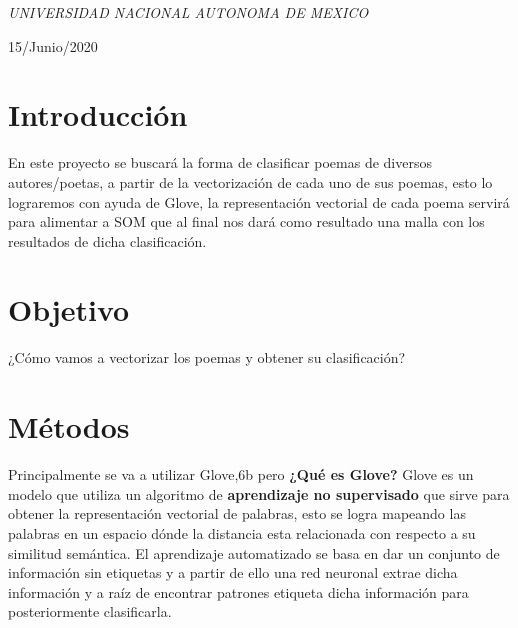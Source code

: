 \documentclass[a4paper, 11pt, oneside]{article}
\begin{document}
\begin{titlepage}
	\textit{UNIVERSIDAD NACIONAL AUTONOMA DE MEXICO} 
	
	\vfill
	
	
	
	
	\vspace{0.3\baselineskip} 
	
    15/Junio/2020
	
	 

\end{titlepage}
\newpage
\section*{Introducción}

En este proyecto se buscará la forma de clasificar poemas de diversos autores/poetas, a partir de la vectorización de cada uno de sus poemas, esto lo lograremos con ayuda de Glove, la representación vectorial de cada poema servirá para alimentar a SOM que al final nos dará como resultado una malla con los resultados de dicha clasificación.

\section*{Objetivo}
¿Cómo vamos a vectorizar los poemas y obtener su clasificación?
\section*{Métodos}
Principalmente se va a utilizar Glove,6b pero \textbf{¿Qué es Glove?} Glove es un modelo que utiliza un algoritmo de \textbf{aprendizaje no supervisado} que sirve para obtener la representación vectorial de palabras, esto se logra mapeando las palabras en un espacio dónde la distancia esta relacionada con respecto a su similitud semántica. El aprendizaje automatizado se basa en dar un conjunto de información sin etiquetas y a partir de ello una red neuronal extrae dicha información y a raíz de encontrar patrones etiqueta dicha información para posteriormente clasificarla.
\end{document}
